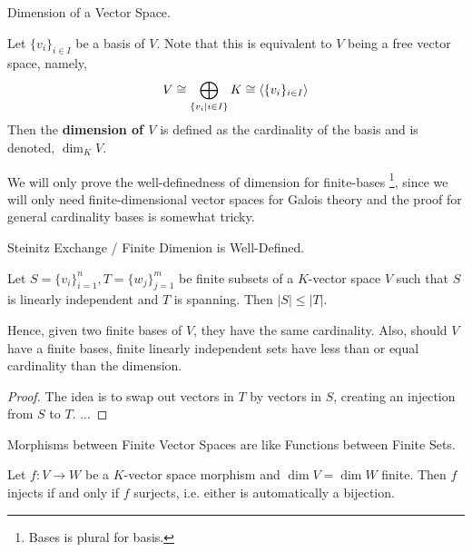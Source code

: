 \documentclass[../../book.tex]{subfiles}
\begin{document}
\begin{dfn} Dimension of a Vector Space.

    Let $\{v_i\}_{i\in I}$ be a basis of $V$. 
    Note that this is equivalent to $V$ being a free vector space, namely, 
    \[
        V \cong \bigoplus_{\{v_i \mid i\in I\}} K \cong \langle\{v_i\}_{i\in I}\rangle 
    \]
    Then the \textbf{dimension of $V$} is defined as the cardinality of the basis
    and is denoted, $\dim_K V$. 
    
    We will only prove the well-definedness of dimension for finite-bases
    \footnote{Bases is plural for basis.}, 
    since we will only need finite-dimensional vector spaces for Galois theory
    and the proof for general cardinality bases is somewhat tricky. 
\end{dfn}
\begin{lem} Steinitz Exchange / Finite Dimenion is Well-Defined. 

    Let $S = \{v_i\}_{i=1}^n, T = \{w_j\}_{j=1}^m$ be finite subsets 
    of a $K$-vector space $V$ such that 
    $S$ is linearly independent and $T$ is spanning. 
    Then $|S| \leq |T|$.
    
    Hence, given two finite bases of $V$, they have the same cardinality. 
    Also, should $V$ have a finite bases,
    finite linearly independent sets have less than or equal cardinality
    than the dimension.
\end{lem}
\begin{proof}
    The idea is to swap out vectors in $T$ by vectors in $S$, 
    creating an injection from $S$ to $T$. 
    ...
\end{proof}
\begin{cor} Morphisms between Finite Vector Spaces 
are like Functions between Finite Sets. 

    Let $f : V \to W$ be a $K$-vector space morphism and $\dim V = \dim W$ finite.
    Then $f$ injects if and only if $f$ surjects, i.e.
    either is automatically a bijection. 
\end{cor}
\end{document}
